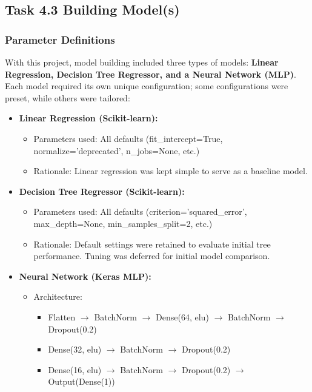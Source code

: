 \subsection*{Task 4.3 Building Model(s)}

\subsubsection*{Parameter Definitions}

With this project, model building included three types of models: \textbf{Linear Regression, Decision Tree Regressor, and a Neural Network (MLP)}. Each model required its own unique configuration; some configurations were preset, while others were tailored:

\begin{itemize}
  \item \textbf{Linear Regression (Scikit-learn):}
  \begin{itemize}
    \item Parameters used: All defaults (fit\_intercept=True, normalize='deprecated', n\_jobs=None, etc.)
    \item Rationale: Linear regression was kept simple to serve as a baseline model.
  \end{itemize}
  \item \textbf{Decision Tree Regressor (Scikit-learn):}
  \begin{itemize}
    \item Parameters used: All defaults (criterion='squared\_error', max\_depth=None, min\_samples\_split=2, etc.)
    \item Rationale: Default settings were retained to evaluate initial tree performance. Tuning was deferred for initial model comparison.
  \end{itemize}
  \item \textbf{Neural Network (Keras MLP):}
  \begin{itemize}
    \item Architecture:
    \begin{itemize}
      \item Flatten $\rightarrow$ BatchNorm $\rightarrow$ Dense(64, elu) $\rightarrow$ BatchNorm $\rightarrow$ Dropout(0.2)
      \item Dense(32, elu) $\rightarrow$ BatchNorm $\rightarrow$ Dropout(0.2)
      \item Dense(16, elu) $\rightarrow$ BatchNorm $\rightarrow$ Dropout(0.2) $\rightarrow$ Output(Dense(1))
    \end{itemize}

\end{itemize}
\end{itemize}
